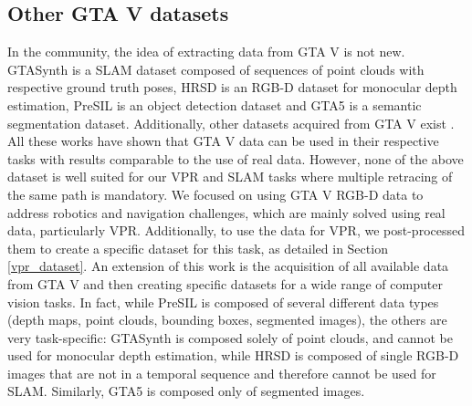 \subsection{Other GTA V datasets}
In the community, the idea of extracting data from GTA V is not new. GTASynth \cite{gtasynth} is a SLAM dataset composed of sequences of point clouds with respective ground truth poses, HRSD \cite{hrsd} is an RGB-D dataset for monocular depth estimation, PreSIL \cite{presil} is an object detection dataset and GTA5 \cite{gta_seg} is a semantic segmentation dataset. Additionally, other datasets acquired from GTA V exist \cite{gta_drone, gta_people}. All these works have shown that GTA V data can be used in their respective tasks with results comparable to the use of real data. However, none of the above dataset is well suited for our VPR and SLAM tasks where multiple retracing of the same path is mandatory.
We focused on using GTA V RGB-D data to address robotics and navigation challenges, which are mainly solved using real data, particularly VPR. Additionally, to use the data for VPR, we post-processed them to create a specific dataset for this task, as detailed in Section \ref{vpr_dataset}.
An extension of this work is the acquisition of all available data from GTA V and then creating specific datasets for a wide range of computer vision tasks. In fact, while PreSIL is composed of several different data types (depth maps, point clouds, bounding boxes, segmented images), the others are very task-specific: GTASynth is composed solely of point clouds, and cannot be used for monocular depth estimation, while HRSD is composed of single RGB-D images that are not in a temporal sequence and therefore cannot be used for SLAM. Similarly, GTA5 is composed only of segmented images.